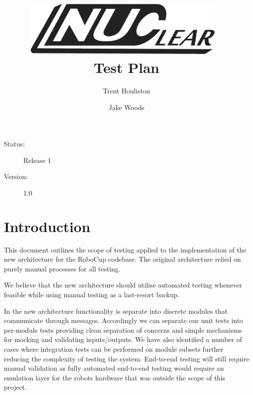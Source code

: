 \documentclass[english,12pt]{scrartcl}
\title{\includegraphics[width=0.75\textwidth]{./Logo/NUClear-logo}~\\[1cm] Test Plan}
\author{Trent Houliston \and Jake Woods}
\begin{document}
	\maketitle
	\vfill
	{\large
		\begin{description}
			\item [Status:] Release 1
			\item [Version:] 1.0
		\end{description}}

	\clearpage
	\tableofcontents
	\clearpage

\section{Introduction}
	This document outlines the scope of testing applied to the implementation of the new architecture for the RoboCup codebase. 
	The original architecture relied on purely manual processes for all testing.
	 
	We believe that the new architecture should utilise automated testing whenever feasible while using manual testing as a last-resort backup.
	
	In the new architecture functionality is separate into discrete modules that communicate through messages. 
	Accordingly we can separate our unit tests into per-module tests providing clean separation of concerns and simple mechanisms for mocking and validating inputs/outputs.
	We have also identified a number of cases where integration tests can be performed on module subsets further reducing the complexity of testing the system.
	End-to-end testing will still require manual validation as fully automated end-to-end testing would require an emulation layer for the robots hardware that was outside the scope of this project.
\end{document}
